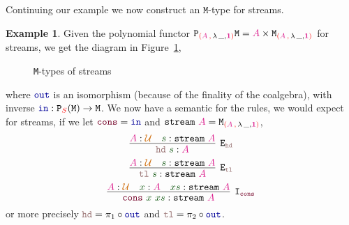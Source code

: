\documentclass[twoside,11pt,openright]{report}
\theoremstyle{plain} %
\theoremstyle{definition}
\newtheorem{exmp}{Example}[section]
\theoremstyle{remark}
\newcommand*{\figref}[1]{Figure~\ref{fig:#1}}
\newcommand*{\term}[1]{\textcolor{green!30!black}{#1}} %
\newcommand*{\type}[1]{\textcolor{magenta!90!black}{#1}}
\newcommand*{\container}[1]{\textcolor{red}{#1}}
\newcommand*{\containerpair}[2]{\textcolor{red}{(}#1\,\textcolor{red}{,}\,#2\textcolor{red}{)}}
\newcommand*{\universe}[1]{\textcolor{orange!80!black}{#1}}
\newcommand*{\unit}{\type{\textbf{1}}}
\newcommand*{\function}[1]{\textcolor{blue!60!black}{\ensuremath{\mathtt{#1}}}}
\newcommand*{\constructor}[1]{\textcolor{purple!60!black}{\ensuremath{\mathtt{#1}}}}
\newcommand*{\destructor}[1]{\textcolor{pink!60!black}{\ensuremath{\mathtt{#1}}}}
\newcommand*{\typeformer}[1]{\ensuremath{\mathtt{#1}}}
\newcommand*{\functor}[1]{\ensuremath{\mathbf{\mathtt{#1}}}}
\begin{document}
\noindent Continuing our example we now construct an \(\mathtt{M}\)-type for streams.
\begin{exmp} Given the polynomial functor \(\functor{P}_{\containerpair{\type{A}}{\lambda\,\_,\unit}} \typeformer{M} = \type{A} \times \typeformer{M}_{\containerpair{\type{A}}{\lambda\,\_,\unit}}\) for streams, we get the diagram in \figref{stream-M-type},
  \begin{figure}[h]
    \centering
    \caption{\texttt{M}-types of streams}
    \label{fig:stream-M-type}
  \end{figure}
  where \(\function{out}\) is an isomorphism (because of the finality of the coalgebra), with inverse \(\function{in} : \functor{P}_{\container{S}}(\typeformer{M}) \rightarrow \typeformer{M}\). We now have a semantic for the rules, we would expect for streams, if we let \(\constructor{cons} = \function{in}\) and \(\typeformer{stream}~\type{A} = \typeformer{M}_{\containerpair{\type{A}}{\lambda\,\_,\unit}}\),
  \begin{equation}
    \infer[\mathtt{E}_{\destructor{hd}}]{\destructor{hd}~\term{s} : \type{A}}{\type{A} : \universe{\mathcal{U}} & \term{s} : \typeformer{stream}~\type{A}}
  \end{equation}
  \begin{equation}
    \infer[\mathtt{E}_{\destructor{tl}}]{\destructor{tl}~\term{s} : \typeformer{stream}~\type{A}}{\type{A} : \universe{\mathcal{U}} & \term{s} : \typeformer{stream}~\type{A}}
  \end{equation}
  \begin{equation}
    \infer[\mathtt{I}_{\constructor{cons}}]{\term{\constructor{cons}}~\term{x}~\term{xs} : \typeformer{stream}~\type{A}}{\type{A} : \universe{\mathcal{U}} & \term{x} : \type{A} & \term{xs} : \typeformer{stream}~\type{A}}
  \end{equation}
  or more precisely \(\destructor{hd} = \pi_1 \circ \function{out}\) and \(\destructor{tl} = \pi_2 \circ \function{out}\).
\end{exmp}
\end{document}
